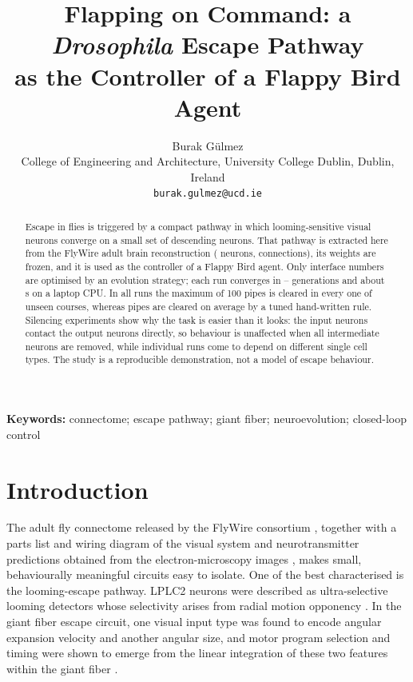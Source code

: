 \documentclass[11pt]{article}
\title{\textbf{Flapping on Command: a \textit{Drosophila} Escape Pathway\\as the Controller of a Flappy Bird Agent}}
\author{Burak G\"ulmez\\[2pt]
\small College of Engineering and Architecture, University College Dublin, Dublin, Ireland\\
\small \texttt{burak.gulmez@ucd.ie}}
\date{}
\begin{document}
\maketitle

\begin{abstract}
\noindent
Escape in flies is triggered by a compact pathway in which looming-sensitive visual neurons converge
on a small set of descending neurons. That pathway is extracted here from the FlyWire adult brain
reconstruction (\Neurons{} neurons, \Edges{} connections), its weights are frozen, and it is used as
the controller of a Flappy Bird agent. Only \NParams{} interface numbers are optimised by an
evolution strategy; each run converges in \GensMin{}--\GensMax{} generations and about
\TrainTimeMean{}\,s on a laptop CPU. In all \NSeeds{} runs the maximum of 100 pipes is cleared in
every one of \TestGames{} unseen courses, whereas \HeurMean{} pipes are cleared on average by a tuned
hand-written rule. Silencing experiments show why the task is easier than it looks: the input neurons
contact the output neurons directly, so behaviour is unaffected when all \Intermediates{}
intermediate neurons are removed, while individual runs come to depend on different single cell
types. The study is a reproducible demonstration, not a model of escape behaviour.
\end{abstract}

\textbf{Keywords:} connectome; escape pathway; giant fiber; neuroevolution; closed-loop control

\section{Introduction}
The adult fly connectome released by the FlyWire consortium \cite{dorkenwald2024}, together with a
parts list and wiring diagram of the visual system \cite{matsliah2024} and neurotransmitter
predictions obtained from the electron-microscopy images \cite{eckstein2024}, makes small,
behaviourally meaningful circuits easy to isolate. One of the best characterised is the
looming-escape pathway. LPLC2 neurons were described as ultra-selective looming detectors whose
selectivity arises from radial motion opponency \cite{klapoetke2017}. In the giant fiber escape
circuit, one visual input type was found to encode angular expansion velocity and another angular
size, and motor program selection and timing were shown to emerge from the linear integration of
these two features within the giant fiber \cite{vonreyn2017}.
\end{document}
